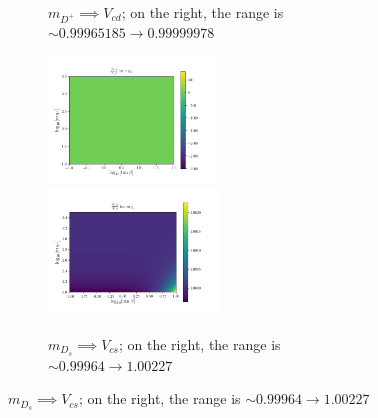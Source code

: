 \documentclass[11pt]{article}
\begin{document}
\begin{figure}[H]
\begin{subfigure}[b]{\textwidth}
        \caption{$m_{D^+} \implies V_{cd}$; on the right, the range is $\sim0.99965185\to0.99999978$}
    \end{subfigure}
    \begin{subfigure}[b]{\textwidth}
        \includegraphics[width=0.49\textwidth]{heatmaps/mDs-rH0.png}
        \includegraphics[width=0.5\textwidth]{heatmaps/mDs-rH1.png}
        \caption{$m_{D_s} \implies V_{cs}$; on the right, the range is $\sim0.99964\to1.00227$}
    \end{subfigure}
\end{figure}
\newpage
\end{document}

